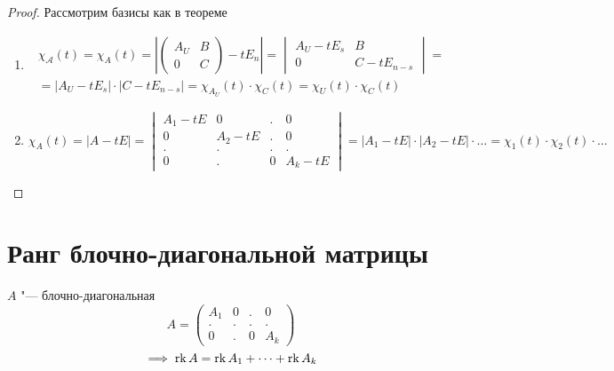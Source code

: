 \begin{proof}
	Рассмотрим базисы как в теореме
	\begin{enumerate}
		\item
		\begin{multline*}
			\chi_{\mathcal{A}}(t) = \chi_A(t) = \left|
			\begin{pmatrix}
				A_U & B \\
				0 & C
			\end{pmatrix} - t E_n \right| =
			\begin{vmatrix}
				A_U - t E_s & B \\
				0 & C - t E_{n - s}
			\end{vmatrix} = \\
			= |A_U - t E_s | \cdot | C - t E_{n -s} | = \chi_{A_U}(t) \cdot \chi_C(t) = \chi_U(t) \cdot \chi_C(t)
		\end{multline*}
		\item $ \chi_A(t) = |A - tE| =
		\begin{vmatrix}
			A_1 - tE & 0 & . & 0 \\
			0 & A_2 - tE & . & 0 \\
			. & . & . & . \\
			0 & . & 0 & A_k - tE
		\end{vmatrix} = |A_1 - tE| \cdot |A_2 - tE| \cdot \dots = \chi_1(t) \cdot \chi_2(t) \cdot \dots $
	\end{enumerate}
\end{proof}

\section{Ранг блочно-диагональной матрицы}

\begin{lemma}
	$ A $ "--- блочно-диагональная
	$$ A =
	\begin{pmatrix}
		A_1 & 0 & . & 0 \\
		. & . & . & . \\
		0 & . & 0 & A_k
	\end{pmatrix} $$
	$$ \implies \operatorname{rk} A = \operatorname{rk} A_1 + \dots + \operatorname{rk} A_k $$
\end{lemma}

